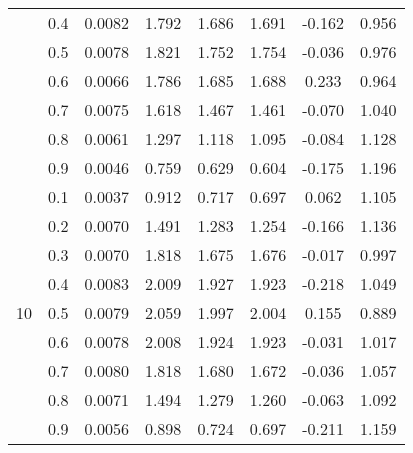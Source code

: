 \documentclass[11pt,a4paper]{report}
\begin{document}
\begin{longtable}{ | c | c || c | c | c | c | c | c | }
 & 0.4 & 0.0082 & 1.792 & 1.686 & 1.691 & -0.162 & 0.956 \\
 & 0.5 & 0.0078 & 1.821 & 1.752 & 1.754 & -0.036 & 0.976 \\
 & 0.6 & 0.0066 & 1.786 & 1.685 & 1.688 & 0.233 & 0.964 \\
 & 0.7 & 0.0075 & 1.618 & 1.467 & 1.461 & -0.070 & 1.040 \\
 & 0.8 & 0.0061 & 1.297 & 1.118 & 1.095 & -0.084 & 1.128 \\
 & 0.9 & 0.0046 & 0.759 & 0.629 & 0.604 & -0.175 & 1.196 \\
 \hline
\multirow{9}{*}{10} & 0.1 & 0.0037 & 0.912 & 0.717 & 0.697 & 0.062 & 1.105 \\
 & 0.2 & 0.0070 & 1.491 & 1.283 & 1.254 & -0.166 & 1.136 \\
 & 0.3 & 0.0070 & 1.818 & 1.675 & 1.676 & -0.017 & 0.997 \\
 & 0.4 & 0.0083 & 2.009 & 1.927 & 1.923 & -0.218 & 1.049 \\
 & 0.5 & 0.0079 & 2.059 & 1.997 & 2.004 & 0.155 & 0.889 \\
 & 0.6 & 0.0078 & 2.008 & 1.924 & 1.923 & -0.031 & 1.017 \\
 & 0.7 & 0.0080 & 1.818 & 1.680 & 1.672 & -0.036 & 1.057 \\
 & 0.8 & 0.0071 & 1.494 & 1.279 & 1.260 & -0.063 & 1.092 \\
 & 0.9 & 0.0056 & 0.898 & 0.724 & 0.697 & -0.211 & 1.159 \\
 \hline
\hline
\end{longtable}
\end{document}
